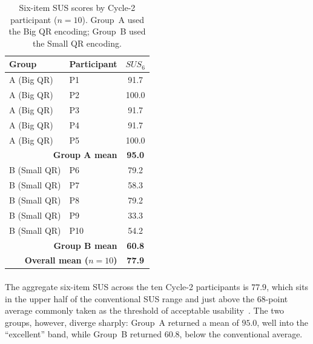 \begin{table}[H]
  \centering
  \caption{Six-item SUS scores by Cycle-2 participant ($n = 10$). Group~A used the Big QR encoding; Group~B used the Small QR encoding.}
  \label{tab:sus}
  \begin{tabular}{|l|l|c|}
    \hline
    Group & Participant & $\textit{SUS}_{6}$ \\\hline
    A (Big QR)   & P1 & 91.7 \\\hline
    A (Big QR)   & P2 & 100.0 \\\hline
    A (Big QR)   & P3 & 91.7 \\\hline
    A (Big QR)   & P4 & 91.7 \\\hline
    A (Big QR)   & P5 & 100.0 \\\hline
    \multicolumn{2}{|r|}{\textbf{Group A mean}} & \textbf{95.0} \\\hline
    B (Small QR) & P6  & 79.2 \\\hline
    B (Small QR) & P7  & 58.3 \\\hline
    B (Small QR) & P8  & 79.2 \\\hline
    B (Small QR) & P9  & 33.3 \\\hline
    B (Small QR) & P10 & 54.2 \\\hline
    \multicolumn{2}{|r|}{\textbf{Group B mean}} & \textbf{60.8} \\\hline
    \multicolumn{2}{|r|}{\textbf{Overall mean ($n = 10$)}} & \textbf{77.9} \\\hline
  \end{tabular}
\end{table}

\paragraph{}The aggregate six-item SUS across the ten Cycle-2 participants is $77.9$, which sits in the upper half of the conventional SUS range and just above the $68$-point average commonly taken as the threshold of acceptable usability~\cite{bangor2008sus}. The two groups, however, diverge sharply: Group~A returned a mean of $95.0$, well into the ``excellent'' band, while Group~B returned $60.8$, below the conventional average.

